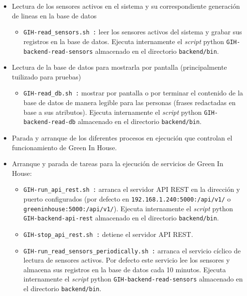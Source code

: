 \begin{itemize}
\begin{itemize}
            \end{itemize}
            \item Lectura de los sensores activos en el sistema y su correspondiente generación de lineas en la base de datos    
            \begin{itemize}
                \item \texttt{GIH-read\_sensors.sh :} leer los sensores activos del sistema y grabar sus registros en la base de datos. Ejecuta internamente el \textit{script} python \texttt{GIH-backend-read-sensors} almacenado en el directorio \texttt{backend/bin}.
            \end{itemize}
            \item Lectura de la base de datos para mostrarla por pantalla (principalmente tuilizado para pruebas)   
            \begin{itemize}
                \item \texttt{GIH-read\_db.sh :} mostrar por pantalla o por terminar el contenido de la base de datos de manera legible para las personas (frases redactadas en base a sus atributos). Ejecuta internamente el \textit{script} python \texttt{GIH-backend-read-db} almacenado en el directorio \texttt{backend/bin}.
            \end{itemize}
            \item Parada y arranque de los diferentes procesos en ejecución que controlan el funcionamiento de Green In House.    
            \item Arranque y parada de tareas para la ejecución de servicios de Green In House:
            \begin{itemize}
                \item \texttt{GIH-run\_api\_rest.sh :} arranca el servidor API REST en la dirección y puerto configurados (por defecto en \texttt{192.168.1.240:5000:/api/v1/} o \texttt{greeninhouse:5000:/api/v1/}). Ejecuta internamente el \textit{script} python \texttt{GIH-backend-api-rest} almacenado en el directorio \texttt{backend/bin}.
                \item \texttt{GIH-stop\_api\_rest.sh :} detiene el servidor API REST.
                \item \texttt{GIH-run\_read\_sensors\_periodically.sh :} arranca el servicio cíclico de lectura de sensores activos. Por defecto este servicio lee los sensores y almacena sus registros en la base de datos cada 10 minutos. Ejecuta internamente el \textit{script} python \texttt{GIH-backend-read-sensors} almacenado en el directorio \texttt{backend/bin}.

\end{itemize}
\end{itemize}
